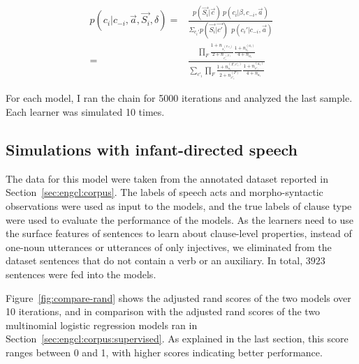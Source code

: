 \begin{equation} \label{eq:engcl:target}
\begin{split}
p(c_{i}| c_{-i}, \vec{a}, \vec{S_{i}}, \delta) = &\frac{p(\vec{S_{i}}| \vec{c})\ p(c_{i}|\beta, c_{-i}, \vec{a})}{\Sigma_{c_{i}'}p(\vec{S_{i}}| \vec{c'})\ \ p(c_{i}'| c_{-i}, \vec{a})}\\
= & \frac{ \prod_{F}\frac{1+n_{s^{(F, c_{i})}_{i}}}{2+n_{c^{(F)}_{i}}}%
\frac{1+n_{c_{i}}^{(a_{i})}}{4+n_{a_{i}}}%
}%
{\sum_{c'_{i}}\prod_{F}\frac{1+n^{(F, c'_{i})}_{s_{i}}}{2+n^{(F)}_{c'_{i}}}%
\frac{1+n_{c'_{i}}^{(a_{i})}}{4+n_{a_{i}}} %
}%
\end{split}
\end{equation}





For each model, I ran the chain for 5000 iterations and analyzed the last sample. Each learner was simulated 10 times. 


\subsection{Simulations with infant-directed speech}
\label{sec:engcl:model:results}

The data for this model were taken from the annotated dataset reported in Section~\ref{sec:engcl:corpus}. The labels of speech acts and morpho-syntactic observations were used as input to the models, and the true labels of clause type were used to evaluate the performance of the models. As the learners need to use the surface features of sentences to learn about clause-level properties, instead of one-noun utterances or utterances of only injectives, we eliminated from the dataset sentences that do not contain a verb or an auxiliary. In total, $3923$  sentences were fed into the models.


Figure~\ref{fig:compare-rand} shows the adjusted rand scores of the two models over 10 iterations, and in comparison with the adjusted rand scores of the two multinomial logistic regression models ran in Section~\ref{sec:engcl:corpus:supervised}. 
As explained in the last section, this score ranges between 0 and 1, with higher scores indicating better performance. 

